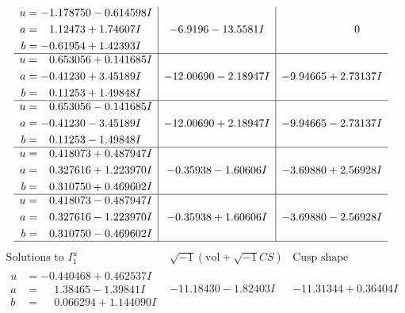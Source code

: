 \documentclass[1p]{elsarticle_modified}
\theoremstyle{definition}
\newcommand{\I}{\sqrt{-1}}
\begin{document}
$$\begin{array}{c|c|c}
\begin{aligned}
u &= -1.178750 - 0.614598 I \\
a &= \phantom{-}1.12473 + 1.74607 I \\
b &= -0.61954 + 1.42393 I\end{aligned}
 & -6.9196 - 13.5581 I & \phantom{-0.000000 } 0 \\ \hline\begin{aligned}
u &= \phantom{-}0.653056 + 0.141685 I \\
a &= -0.41230 + 3.45189 I \\
b &= \phantom{-}0.11253 + 1.49848 I\end{aligned}
 & -12.00690 - 2.18947 I & -9.94665 + 2.73137 I \\ \hline\begin{aligned}
u &= \phantom{-}0.653056 - 0.141685 I \\
a &= -0.41230 - 3.45189 I \\
b &= \phantom{-}0.11253 - 1.49848 I\end{aligned}
 & -12.00690 + 2.18947 I & -9.94665 - 2.73137 I \\ \hline\begin{aligned}
u &= \phantom{-}0.418073 + 0.487947 I \\
a &= \phantom{-}0.327616 + 1.223970 I \\
b &= \phantom{-}0.310750 + 0.469602 I\end{aligned}
 & -0.35938 - 1.60606 I & -3.69880 + 2.56928 I \\ \hline\begin{aligned}
u &= \phantom{-}0.418073 - 0.487947 I \\
a &= \phantom{-}0.327616 - 1.223970 I \\
b &= \phantom{-}0.310750 - 0.469602 I\end{aligned}
 & -0.35938 + 1.60606 I & -3.69880 - 2.56928 I\\
 \hline 
 \end{array}$$\newpage$$\begin{array}{c|c|c}  
\text{Solutions to }I^u_{1}& \I (\text{vol} + \sqrt{-1}CS) & \text{Cusp shape}\\
 \hline 
\begin{aligned}
u &= -0.440468 + 0.462537 I \\
a &= \phantom{-}1.38465 - 1.39841 I \\
b &= \phantom{-}0.066294 + 1.144090 I\end{aligned}
 & -11.18430 - 1.82403 I & -11.31344 + 0.36404 I \\ \hline\begin{aligned}

\end{aligned}
\end{array}$$
\end{document}
